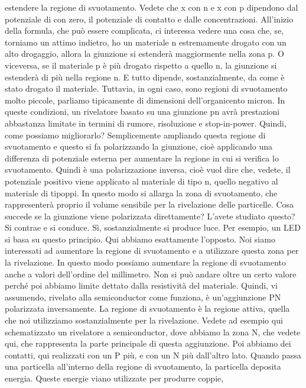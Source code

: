 estendere la regione di svuotamento. Vedete che x con n e x con p dipendono dal potenziale di con zero, il potenziale di contatto e dalle concentrazioni. All'inizio della formula, che può essere complicata, ci interessa vedere una cosa che, se, torniamo un attimo indietro, ho un materiale n estremamente drogato con un alto drogaggio, allora la giunzione si estenderà maggiormente nella zona p. O viceversa, se il materiale p è più drogato rispetto a quello n, la giunzione si estenderà di più nella regione n. E tutto dipende, sostanzialmente, da come è stato drogato il materiale. Tuttavia, in ogni caso, sono regioni di svuotamento molto piccole, parliamo tipicamente di dimensioni dell'organicento micron. In queste condizioni, un rivelatore basato su una giunzione pn avrà prestazioni abbastanza limitate in termini di rumore, risoluzione e stop-in-power. Quindi, come possiamo migliorarlo? Semplicemente ampliando questa regione di svuotamento e questo si fa polarizzando la giunzione, cioè applicando una differenza di potenziale esterna per aumentare la regione in cui si verifica lo svuotamento. Quindi è una polarizzazione inversa, cioè vuol dire che, vedete, il potenziale positivo viene applicato al materiale di tipo n, quello negativo al materiale di tipoppi. In questo modo si allarga la zona di svuotamento, che rappresenterà proprio il volume sensibile per la rivelazione delle particelle. Cosa succede se la giunzione viene polarizzata direttamente? L'avete studiato questo? Si contrae e si conduce. Sì, sostanzialmente si produce luce. Per esempio, un LED si basa su questo principio. Qui abbiamo esattamente l'opposto. Noi siamo interessati ad aumentare la regione di svuotamento e a utilizzare questa zona per la rivelazione. In questo modo possiamo aumentare la regione di svuotamento anche a valori dell'ordine del millimetro. Non si può andare oltre un certo valore perché poi abbiamo limite dettato dalla resistività del materiale. Quindi, vi assumendo, rivelato alla semiconductor come funziona, è un'aggiunzione PN polarizzata inversamente. La regione di svuotamento è la regione attiva, quella che noi utilizziamo sostanzialmente per la rivelazione. Vedete ad esempio qui schematizzato un rivelatore a semiconductor, dove abbiamo la zona N, che vedete qui, che rappresenta la parte principale di questa aggiunzione. Poi abbiamo dei contatti, qui realizzati con un P più, e con un N più dall'altro lato. Quando passa una particella all'interno della regione di svuotamento, la particella deposita energia. Queste energie viano utilizzate per produrre coppie, 

